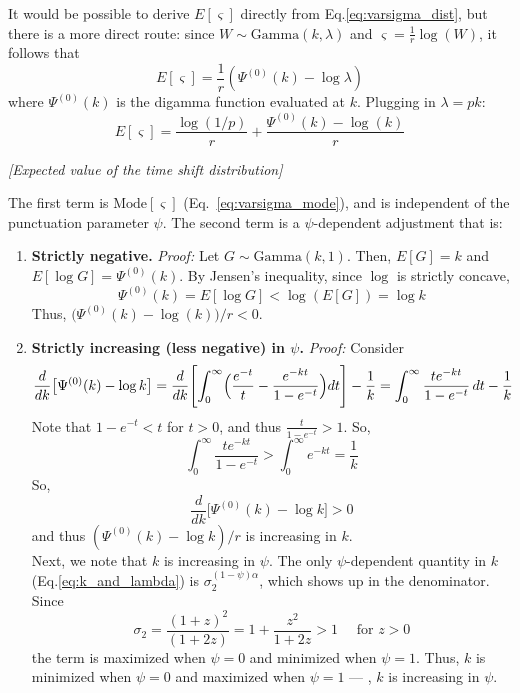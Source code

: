 It would be possible to derive $E[\varsigma]$ directly from Eq.\ref{eq:varsigma_dist}, but there is a more direct route: since $W \sim \text{Gamma}(k,\lambda)$ and $\varsigma = \frac{1}{r} \log(W)$, it follows that 
\begin{equation}
	E[\varsigma] = \frac{1}{r}(\Psi^{(0)}(k) - \log \lambda)
\end{equation}
where $\Psi^{(0)}(k)$ is the digamma function evaluated at $k$. Plugging in $\lambda = pk$: 
\begin{equation}
\boxed{E[\varsigma] = \frac{\log(1/p)}{r} + \frac{\Psi^{(0)}(k) - \log(k)}{r}}
\end{equation}
\begin{center}
	{\it [Expected value of the time shift distribution]}
\end{center}
The first term is $\text{Mode}[\varsigma]$ (Eq.~\ref{eq:varsigma_mode}), and is independent of the punctuation parameter $\psi$. The second term is a $\psi$-dependent adjustment that is: 
\begin{enumerate}
	\item {\bf  Strictly negative.} {\it Proof:} Let $G \sim \text{Gamma}(k,1)$. Then, $E[G] = k$ and $E[\log G] = \Psi^{(0)}(k)$. By Jensen's inequality, since $\log$ is strictly concave, 
	\[\Psi^{(0)}(k) = E[\log G] < \log(E[G]) = \log k \]
	Thus, $\bigl(\Psi^{(0)}(k) - \log(k)\bigr)/r < 0$. 
	\item {\bf \boldmath Strictly increasing (less negative) in $\psi$.} {\it Proof:} Consider 
	\[\frac{d}{dk} \bigl[ \Psi^{(0)}(k) - \log k \bigr] = 
	\frac{d}{dk} \Biggl[ \int_0^\infty \Bigl(\frac{e^{-t}}{t} - \frac{e^{-kt}}{1 - e^{-t}}\Bigr) dt \Biggr] - \frac{1}{k} 
	= \int_0^\infty \frac{t e^{-k t }}{1 - e^{-t}}\, dt  - \frac{1}{k}
	\]
	Note that $1 - e^{-t} < t$ for $t > 0$, and thus $\frac{t}{1 - e^{-t}} > 1$. So, 
	\[  
	\int_0^\infty \frac{t e^{-kt}}{1 - e^{-t}} > \int_0^\infty e^{-kt} = \frac{1}{k}
	 \]
	 So, 
	 \[\frac{d}{dk} \bigl[ \Psi^{(0)}(k) - \log k \bigr] > 0 \]
	 and thus $(\Psi^{(0)}(k) - \log k)/r$ is increasing in $k$. \\ 
	 Next, we note that $k$ is increasing in $\psi$. The only $\psi$-dependent quantity in $k$ (Eq.\ref{eq:k_and_lambda}) is $\sigma_2^{(1-\psi)\alpha}$, which shows up in the denominator. Since
	 \[\sigma_2 = \frac{(1 + z)^2}{(1 + 2z)} = 1 + \frac{z^2}{1 + 2z} > 1 \quad \text{ for  } z > 0\]
	 the term is maximized when $\psi = 0$ and minimized when $\psi = 1$. Thus, $k$ is minimized when $\psi = 0$ and maximized when $\psi = 1$ --- \ie, $k$ is increasing in $\psi$. 
\end{enumerate}

